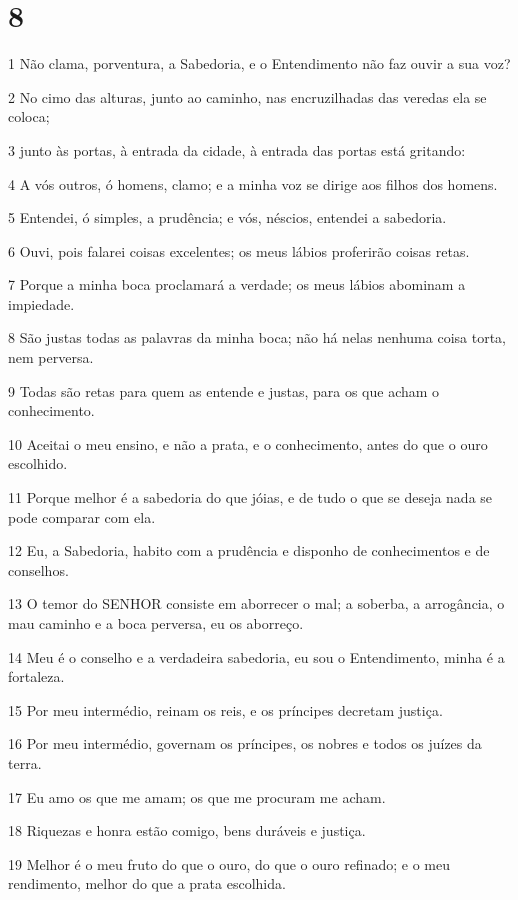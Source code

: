 \chapter{8}

\par 1 Não clama, porventura, a Sabedoria, e o Entendimento não faz ouvir a sua voz?
\par 2 No cimo das alturas, junto ao caminho, nas encruzilhadas das veredas ela se coloca;
\par 3 junto às portas, à entrada da cidade, à entrada das portas está gritando:
\par 4 A vós outros, ó homens, clamo; e a minha voz se dirige aos filhos dos homens.
\par 5 Entendei, ó simples, a prudência; e vós, néscios, entendei a sabedoria.
\par 6 Ouvi, pois falarei coisas excelentes; os meus lábios proferirão coisas retas.
\par 7 Porque a minha boca proclamará a verdade; os meus lábios abominam a impiedade.
\par 8 São justas todas as palavras da minha boca; não há nelas nenhuma coisa torta, nem perversa.
\par 9 Todas são retas para quem as entende e justas, para os que acham o conhecimento.
\par 10 Aceitai o meu ensino, e não a prata, e o conhecimento, antes do que o ouro escolhido.
\par 11 Porque melhor é a sabedoria do que jóias, e de tudo o que se deseja nada se pode comparar com ela.
\par 12 Eu, a Sabedoria, habito com a prudência e disponho de conhecimentos e de conselhos.
\par 13 O temor do SENHOR consiste em aborrecer o mal; a soberba, a arrogância, o mau caminho e a boca perversa, eu os aborreço.
\par 14 Meu é o conselho e a verdadeira sabedoria, eu sou o Entendimento, minha é a fortaleza.
\par 15 Por meu intermédio, reinam os reis, e os príncipes decretam justiça.
\par 16 Por meu intermédio, governam os príncipes, os nobres e todos os juízes da terra.
\par 17 Eu amo os que me amam; os que me procuram me acham.
\par 18 Riquezas e honra estão comigo, bens duráveis e justiça.
\par 19 Melhor é o meu fruto do que o ouro, do que o ouro refinado; e o meu rendimento, melhor do que a prata escolhida.
